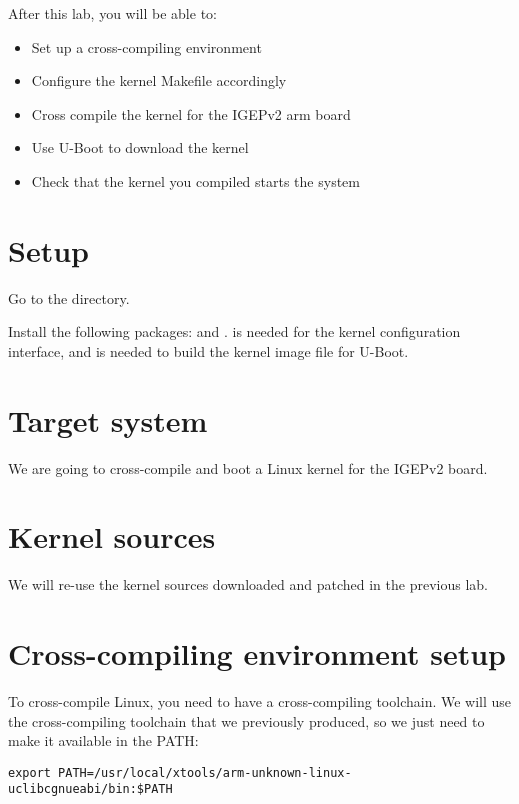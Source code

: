 
After this lab, you will be able to:
\begin{itemize}
\item Set up a cross-compiling environment
\item Configure the kernel Makefile accordingly
\item Cross compile the kernel for the IGEPv2 arm board
\item Use U-Boot to download the kernel
\item Check that the kernel you compiled starts the system
\end{itemize}

\section{Setup}

Go to the  directory.

Install the following packages:  and
.  is needed for the
 kernel configuration interface, and 
is needed to build the  kernel image file for U-Boot.

\section{Target system}

We are going to cross-compile and boot a Linux kernel for the IGEPv2
board.

\section{Kernel sources}

We will re-use the kernel sources downloaded and patched in the
previous lab.

\section{Cross-compiling environment setup}

To cross-compile Linux, you need to have a cross-compiling
toolchain. We will use the cross-compiling toolchain that we
previously produced, so we just need to make it available in the PATH:

\begin{verbatim}
export PATH=/usr/local/xtools/arm-unknown-linux-uclibcgnueabi/bin:$PATH
\end{verbatim}

